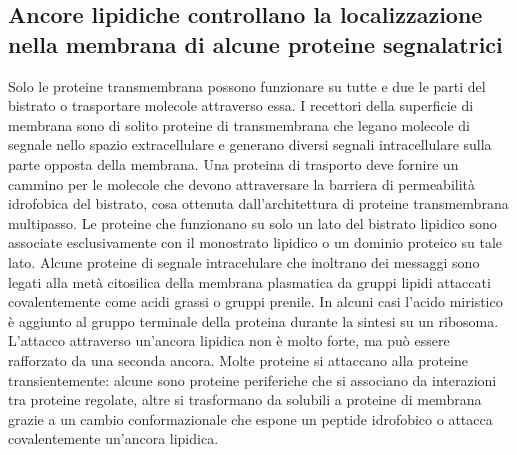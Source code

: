 \subsection{Ancore lipidiche controllano la localizzazione nella membrana di alcune proteine segnalatrici}
Solo le proteine transmembrana possono funzionare su tutte e due le parti del bistrato o trasportare molecole attraverso essa. I recettori della superficie di membrana sono di solito
proteine di transmembrana che legano molecole di segnale nello spazio extracellulare e generano diversi segnali intracellulare sulla parte opposta della membrana. Una proteina di
trasporto deve fornire un cammino per le molecole che devono attraversare la barriera di permeabilit\`a idrofobica del bistrato, cosa ottenuta dall'architettura di proteine transmembrana
multipasso. Le proteine che funzionano su solo un lato del bistrato lipidico sono associate esclusivamente con il monostrato lipidico o un dominio proteico su tale lato. Alcune proteine
di segnale intracelulare che inoltrano dei messaggi sono legati alla met\`a citosilica della membrana plasmatica da gruppi lipidi attaccati covalentemente come acidi grassi o gruppi 
prenile. In alcuni casi l'acido miristico \`e aggiunto al gruppo  terminale della proteina durante la sintesi su un ribosoma. L'attacco attraverso un'ancora lipidica non \`e molto
forte, ma pu\`o essere rafforzato da una seconda ancora. Molte proteine si attaccano alla proteine transientemente: alcune sono proteine periferiche che si associano da interazioni
tra proteine regolate, altre si trasformano da solubili a proteine di membrana grazie a un cambio conformazionale che espone un peptide idrofobico o attacca covalentemente un'ancora 
lipidica.
